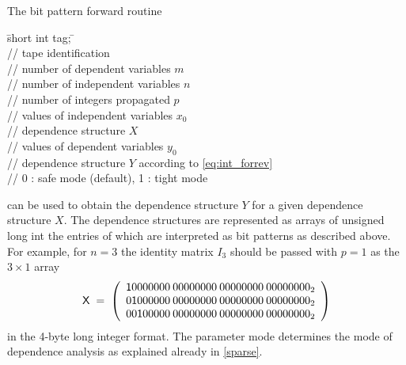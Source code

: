\documentclass[11pt,twoside]{article}
\begin{document}
The bit pattern {\sf forward} routine 
%
\begin{tabbing}
\hspace{0.5in}\={\sf short int tag;} \hspace{1.1in}\= \kill    %
\\
              \> // tape identification \\
                      \> // number of dependent variables $m$\\
                      \> // number of independent variables $n$\\
                      \> // number of integers propagated $p$\\
                \> // values of independent variables $x_0$\\
  \> // dependence structure $X$ \\
                \> // values of dependent variables $y_0$\\
  \> // dependence structure $Y$ according to 
                                     \eqref{eq:int_forrev}\\
                  \> // 0 : safe mode (default), 1 : tight mode
\end{tabbing}
%
can be used to obtain the dependence structure $Y$ for a given dependence structure
$X$. The dependence structures are
represented as arrays of {\sf unsigned long int} the entries of which are
interpreted as bit patterns as described above.   
For example, for $n=3$ the identity matrix $I_3$ should be passed
with $p=1$ as the $3 \times 1$ array
\begin{eqnarray*}
{\sf X} \; = \;
\left( \begin{array}{r}
         {\sf 1}0000000 \: 00000000 \: 00000000 \: 00000000_2 \\
         0{\sf 1}000000 \: 00000000 \: 00000000 \: 00000000_2 \\
         00{\sf 1}00000 \: 00000000 \: 00000000 \: 00000000_2
       \end{array} \right)
\end{eqnarray*}
in the 4-byte long integer format. The parameter {\sf mode} determines
the mode of dependence analysis as explained already in \autoref{sparse}.
\end{document}

